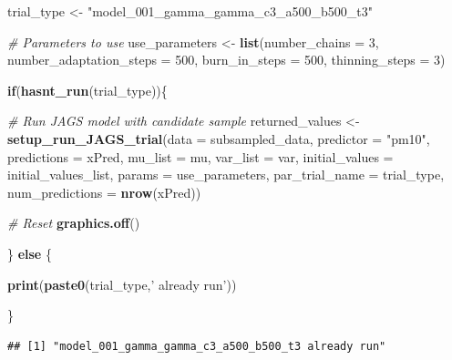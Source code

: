 \documentclass[12pt]{article}
\newenvironment{Shaded}{\begin{snugshade}}{\end{snugshade}}
\newcommand{\CommentTok}[1]{\textcolor[rgb]{0.56,0.35,0.01}{\textit{#1}}}
\newcommand{\ControlFlowTok}[1]{\textcolor[rgb]{0.13,0.29,0.53}{\textbf{#1}}}
\newcommand{\DataTypeTok}[1]{\textcolor[rgb]{0.13,0.29,0.53}{#1}}
\newcommand{\DecValTok}[1]{\textcolor[rgb]{0.00,0.00,0.81}{#1}}
\newcommand{\KeywordTok}[1]{\textcolor[rgb]{0.13,0.29,0.53}{\textbf{#1}}}
\newcommand{\NormalTok}[1]{#1}
\newcommand{\StringTok}[1]{\textcolor[rgb]{0.31,0.60,0.02}{#1}}
\begin{document}
\begin{Shaded}
\begin{Highlighting}[]
\NormalTok{trial_type <-}\StringTok{ "model_001_gamma_gamma_c3_a500_b500_t3"}

\CommentTok{# Parameters to use}
\NormalTok{use_parameters <-}\StringTok{ }\KeywordTok{list}\NormalTok{(}\DataTypeTok{number_chains =} \DecValTok{3}\NormalTok{, }\DataTypeTok{number_adaptation_steps =} \DecValTok{500}\NormalTok{, }\DataTypeTok{burn_in_steps =} \DecValTok{500}\NormalTok{, }\DataTypeTok{thinning_steps =} \DecValTok{3}\NormalTok{)}

\ControlFlowTok{if}\NormalTok{(}\KeywordTok{hasnt_run}\NormalTok{(trial_type))\{}

    \CommentTok{# Run JAGS model with candidate sample}
\NormalTok{    returned_values <-}\StringTok{ }\KeywordTok{setup_run_JAGS_trial}\NormalTok{(}\DataTypeTok{data =}\NormalTok{ subsampled_data, }\DataTypeTok{predictor =} \StringTok{"pm10"}\NormalTok{, }\DataTypeTok{predictions =}\NormalTok{ xPred, }\DataTypeTok{mu_list =}\NormalTok{ mu, }
                                            \DataTypeTok{var_list =}\NormalTok{ var, }\DataTypeTok{initial_values =}\NormalTok{ initial_values_list, }\DataTypeTok{params =}\NormalTok{ use_parameters, }
                                            \DataTypeTok{par_trial_name =}\NormalTok{ trial_type, }\DataTypeTok{num_predictions =} \KeywordTok{nrow}\NormalTok{(xPred))}

    \CommentTok{# Reset}
    \KeywordTok{graphics.off}\NormalTok{()}

\NormalTok{\} }\ControlFlowTok{else}\NormalTok{ \{}
  
  \KeywordTok{print}\NormalTok{(}\KeywordTok{paste0}\NormalTok{(trial_type,}\StringTok{' already run'}\NormalTok{))}
  
\NormalTok{\}}
\end{Highlighting}
\end{Shaded}

\begin{verbatim}
## [1] "model_001_gamma_gamma_c3_a500_b500_t3 already run"
\end{verbatim}
\end{document}
